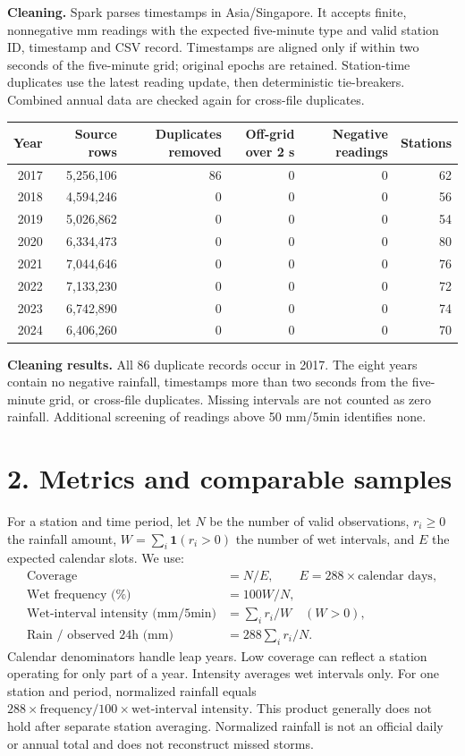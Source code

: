 \documentclass[UTF8,fontset=fandol,10pt,a4paper,landscape]{ctexart}
\begin{document}
\textbf{Cleaning.} Spark parses timestamps in Asia/Singapore. It accepts finite, nonnegative mm readings with the expected five-minute type and valid station ID, timestamp and CSV record. Timestamps are aligned only if within two seconds of the five-minute grid; original epochs are retained. Station-time duplicates use the latest reading update, then deterministic tie-breakers. Combined annual data are checked again for cross-file duplicates.
\begin{center}\begin{tabular}{rrrrrr}
\toprule
Year & Source rows & Duplicates removed & Off-grid over 2 s & Negative readings & Stations\\\midrule
2017 & 5,256,106 & 86 & 0 & 0 & 62\\
2018 & 4,594,246 & 0 & 0 & 0 & 56\\
2019 & 5,026,862 & 0 & 0 & 0 & 54\\
2020 & 6,334,473 & 0 & 0 & 0 & 80\\
2021 & 7,044,646 & 0 & 0 & 0 & 76\\
2022 & 7,133,230 & 0 & 0 & 0 & 72\\
2023 & 6,742,890 & 0 & 0 & 0 & 74\\
2024 & 6,406,260 & 0 & 0 & 0 & 70\\
\bottomrule\end{tabular}\end{center}

\textbf{Cleaning results.} All 86 duplicate records occur in 2017. The eight years contain no negative rainfall, timestamps more than two seconds from the five-minute grid, or cross-file duplicates. Missing intervals are not counted as zero rainfall. Additional screening of readings above 50 mm/5min identifies none.

\clearpage\section*{2. Metrics and comparable samples}
For a station and time period, let $N$ be the number of valid observations, $r_i\geq0$ the rainfall amount, $W=\sum_i\mathbf{1}(r_i>0)$ the number of wet intervals, and $E$ the expected calendar slots. We use:
\begin{align*}
\text{Coverage} &= N/E,\qquad E=288\times\text{calendar days},\\
\text{Wet frequency (\%)} &=100W/N,\\
\text{Wet-interval intensity (mm/5min)} &=\sum_i r_i/W\quad(W>0),\\
\text{Rain / observed 24h (mm)} &=288\sum_i r_i/N.
\end{align*}
Calendar denominators handle leap years. Low coverage can reflect a station operating for only part of a year. Intensity averages wet intervals only. For one station and period, normalized rainfall equals $288\times\text{frequency}/100\times\text{wet-interval intensity}$. This product generally does not hold after separate station averaging. Normalized rainfall is not an official daily or annual total and does not reconstruct missed storms.
\end{document}
